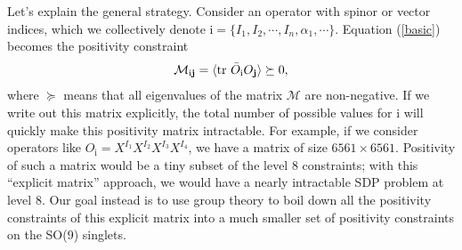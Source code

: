 \documentclass[11pt]{article}
\renewcommand{\ev}[1]{\langle #1 \rangle} %
\def\i{\mathrm{i}}
\begin{document}
Let's explain the general strategy.
Consider an operator with spinor or vector indices, which we collectively denote $\i = \{I_1, I_2, \cdots, I_n, \alpha_1, \cdots \}$. Equation (\ref{basic}) becomes the positivity constraint
\begin{align}
    \mathcal{M}_{\i \j } =  \ev{ \tr \, \bar{O}_\i O_\j } \succeq 0,
\end{align}
where $\succeq$ means that all eigenvalues of the matrix $\mathcal{M}$ are non-negative.
If we write out this matrix explicitly, the total number of possible values for $\i$ will quickly make this positivity matrix intractable. For example, if we consider operators like $O_\i = X^{I_1} X^{I_2} X^{I_3} X^{I_4}$, we have a matrix of size $6561\times 6561$. Positivity of such a matrix would be a tiny subset of the level 8 constraints; with this ``explicit matrix'' approach, we would have a nearly intractable SDP problem at level 8. Our goal instead is to use group theory to boil down all the positivity constraints of this explicit matrix into a much smaller set of positivity constraints on the SO(9) singlets.
\end{document}
